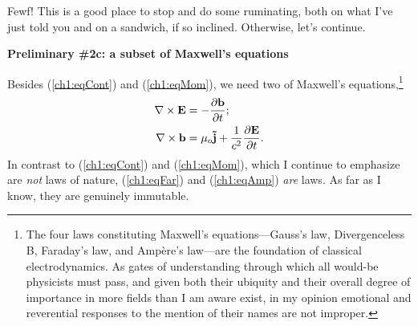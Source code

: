 Fewf! This is a good place to stop and do some ruminating, both on what I've
just told you and on a sandwich, if so inclined. Otherwise, let's continue.

\textbf{Preliminary \#2c: a subset of Maxwell's equations}

Besides (\ref{ch1:eqCont}) and (\ref{ch1:eqMom}), we need two of Maxwell's
equations,\footnote{The four laws constituting Maxwell's equations---Gauss's
  law, Divergenceless B, Faraday's law, and Amp\`{e}re's law---are the
  foundation of classical electrodynamics. As gates of understanding through
  which all would-be physicists must pass, and given both their ubiquity and
  their overall degree of importance in more fields than I am aware exist, in my
  opinion emotional and reverential responses to the mention of their names are
  not improper.}
\begin{subequations}
  \begin{align} {\bf \nabla} \times \mathbf{E} &= - \dfrac{\partial \mathbf{b}}{\partial t}; \label{ch1:eqFar} \\
    {\bf \nabla} \times \mathbf{b} &= \mu_o \mathbf{\tilde j} + \dfrac{1}{c^2} \dfrac{\partial \mathbf{E}}{\partial t}. \label{ch1:eqAmp}
  \end{align}
\end{subequations}
In contrast to (\ref{ch1:eqCont}) and (\ref{ch1:eqMom}), which I continue to
emphasize are \emph{not} laws of nature, (\ref{ch1:eqFar}) and (\ref{ch1:eqAmp})
\emph{are} laws. As far as I know, they are genuinely immutable.%

